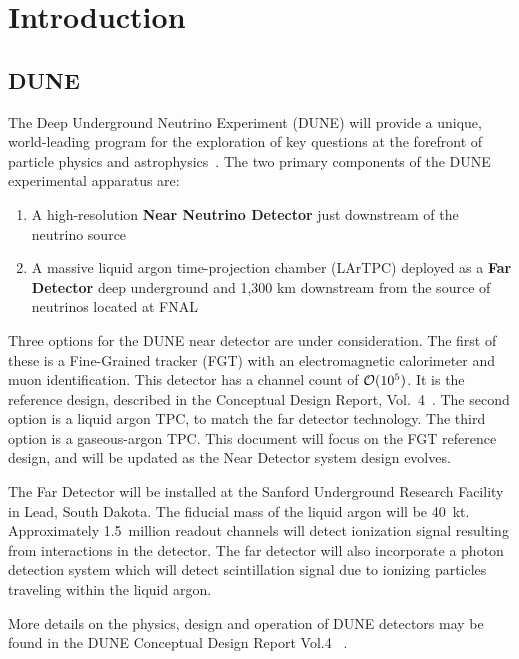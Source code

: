 \section{Introduction}
\subsection{DUNE}

The Deep Underground Neutrino Experiment (DUNE) will provide a unique, world-leading program
for the exploration of key questions at the forefront of particle physics and astrophysics~\cite{sciopps,cdr_vol2}.
The two primary components of the DUNE experimental apparatus are:

\begin{enumerate}

\item A high-resolution \textbf{Near Neutrino Detector} just downstream of the neutrino source
\item A massive liquid argon time-projection chamber (LArTPC) deployed as a \textbf{Far
Detector} deep underground and 1,300 km downstream from the source of neutrinos located at FNAL

\end{enumerate}

Three options for the DUNE near detector are under consideration.  The first of these is a Fine-Grained tracker (FGT) with
an electromagnetic calorimeter and muon identification.  This detector has a channel count of ${\cal O}(10^{5})$.  It is
the reference design, described in the Conceptual Design Report, Vol.~4~\cite{cdr_vol4_docdb}.  The second option is a liquid argon
TPC, to match the far detector technology.  The third option is a gaseous-argon TPC.  This document will focus on the FGT reference
design, and will be updated as the Near Detector system design evolves.

The Far Detector will be installed at the Sanford Underground Research Facility in Lead, South Dakota.
The fiducial mass of the liquid argon will be 40~kt.  Approximately 1.5~million readout
channels will detect ionization signal resulting from interactions in the detector. 
The far detector will also incorporate a photon detection system which will detect scintillation
signal due to ionizing particles traveling within the liquid argon.

More details on the physics, design and operation of DUNE detectors 
may be found in the DUNE Conceptual Design Report Vol.4 ~\cite{cdr_vol4_docdb}. 


